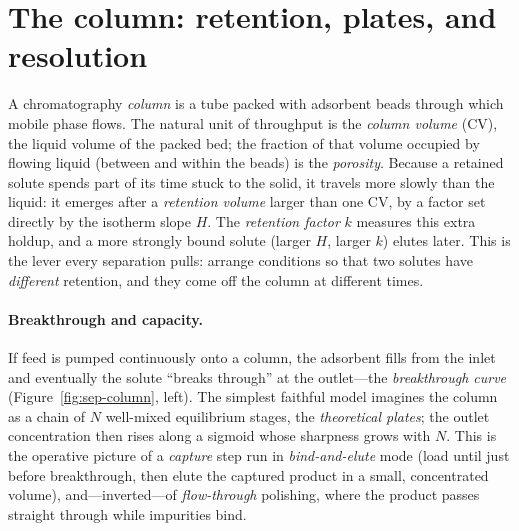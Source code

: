 \section{The column: retention, plates, and resolution}
\label{sec:sep-column}

A chromatography \emph{column} is a tube packed with adsorbent beads through
which mobile phase flows. The natural unit of throughput is the \emph{column
volume} (CV), the liquid volume of the packed bed; the fraction of that volume
occupied by flowing liquid (between and within the beads) is the \emph{porosity}.
Because a retained solute spends part of its time stuck to the solid, it travels
more slowly than the liquid: it emerges after a \emph{retention volume} larger
than one CV, by a factor set directly by the isotherm slope $H$. The
\emph{retention factor} $k$ measures this extra holdup, and a more strongly bound
solute (larger $H$, larger $k$) elutes later. This is the lever every separation
pulls: arrange conditions so that two solutes have \emph{different} retention,
and they come off the column at different times.

\paragraph{Breakthrough and capacity.}
If feed is pumped continuously onto a column, the adsorbent fills from the inlet
and eventually the solute ``breaks through'' at the outlet---the
\emph{breakthrough curve} (Figure~\ref{fig:sep-column}, left). The simplest
faithful model imagines the column as a chain of $N$ well-mixed equilibrium
stages, the \emph{theoretical plates}; the outlet concentration then rises along
a sigmoid whose sharpness grows with $N$. This is the operative picture of a
\emph{capture} step run in \emph{bind-and-elute} mode (load until just before
breakthrough, then elute the captured product in a small, concentrated volume),
and---inverted---of \emph{flow-through} polishing, where the product passes
straight through while impurities bind.

